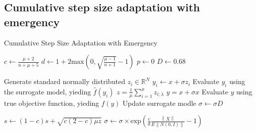 \subsection{Cumulative step size adaptation with emergency}

\begin{algorithm}
\caption{Cumulative Step Size Adaptation with Emergency}
\label{alg:CSA_with_emergency}
\begin{algorithmic}[1]
\STATE $c \leftarrow  \frac{\mu +2}{n+\mu+5}$ 
\STATE $d \leftarrow 1 + 2 \text{max}(0, \sqrt{\frac{\mu - 1}{n+1} } - 1 ) $
\STATE $p \leftarrow 0$
\STATE $D \leftarrow 0.68$

		\STATE Generate standard normally distributed $z_i \in \mathbb{R}^N $
		\STATE $y_i \leftarrow x + \sigma z_i$
		\STATE Evaluate $y_i$ using the surrogate model, yieding $\hat{f}(y_i)$
	\ENDFOR
	\STATE $z = \frac{1}{\mu} \sum_{i=1}^{\mu} z_{i;\lambda}$
	\STATE $y = x + \sigma x$
	\STATE Evaluate $y$ using true objective function, yieding $f(y)$
	\STATE Update surrogate modle 
		\STATE $\sigma \leftarrow \sigma D$
		
	\ELSE
		\STATE $s \leftarrow (1-c)s + \sqrt{ c(2-c) \mu z}$
		\STATE $\sigma \leftarrow \sigma \times \text{exp} \left(\frac{c}{d} \frac{\left\lVert X \right\rVert} { E \left\lVert N(0,I) \right\rVert} -1 \right )$
		
	\ENDIF


\ENDWHILE
\end{algorithmic}
\end{algorithm}


